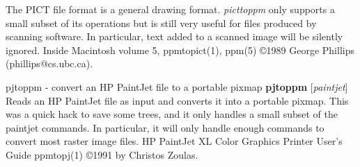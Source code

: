 The PICT file format is a general drawing format.
{\it picttoppm}
only supports a small subset of its operations but is still very useful for
files produced by scanning software.  In particular, text added to a
scanned image will be silently ignored.
Inside Macintosh volume 5,
ppmtopict(1),
ppm(5)
\copyright 1989 George Phillips (phillips@cs.ubc.ca).
%
%
 
%

\newpage
%

pjtoppm - convert an HP PaintJet file to a portable pixmap
{\bf pjtoppm}
{\rm [}{\it paintjet}{\rm ]}
Reads an HP PaintJet file as input and converts it into a portable pixmap.
This was a quick hack to save some trees, and it only handles a small
subset of the paintjet commands.
In particular, it will only handle 
enough commands to convert most raster image files.
HP PaintJet XL Color Graphics Printer User's Guide
ppmtopj(1)
\copyright 1991 by Christos Zoulas.
%
 
%

